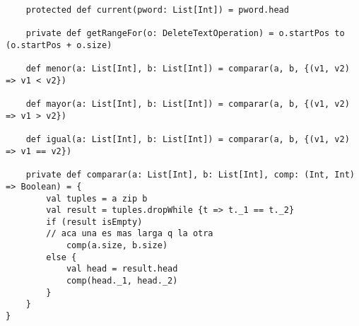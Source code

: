 {\begin{verbatim}
    protected def current(pword: List[Int]) = pword.head

    private def getRangeFor(o: DeleteTextOperation) = o.startPos to (o.startPos + o.size)

    def menor(a: List[Int], b: List[Int]) = comparar(a, b, {(v1, v2) => v1 < v2})

    def mayor(a: List[Int], b: List[Int]) = comparar(a, b, {(v1, v2) => v1 > v2})

    def igual(a: List[Int], b: List[Int]) = comparar(a, b, {(v1, v2) => v1 == v2})

    private def comparar(a: List[Int], b: List[Int], comp: (Int, Int) => Boolean) = {
        val tuples = a zip b
        val result = tuples.dropWhile {t => t._1 == t._2}
        if (result isEmpty)
        // aca una es mas larga q la otra
            comp(a.size, b.size)
        else {
            val head = result.head
            comp(head._1, head._2)
        }
    }
}
\end{verbatim}
}